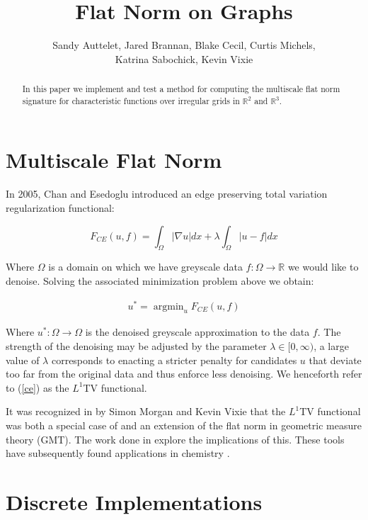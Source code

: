 \documentclass[12pt]{article}
\title{Flat Norm on Graphs}
\author{Sandy Auttelet, Jared Brannan, Blake Cecil, Curtis Michels,\\
 Katrina Sabochick, Kevin Vixie }
\DeclareMathOperator*{\argmin}{argmin}
\begin{document}
\maketitle

\begin{abstract}
In this paper we implement and test a method for computing the multiscale flat norm signature for characteristic functions over irregular grids in $\mathbb{R}^2$ and $\mathbb{R}^3$.
\end{abstract}

\tableofcontents

\section{Multiscale Flat Norm}

In 2005, Chan and Esedoglu introduced an edge preserving total variation regularization functional:

\begin{equation} \label{ce}
F_{CE}(u,f) = \int_\Omega |\nabla u| dx + \lambda \int_{\Omega} |u-f|dx
\end{equation}

Where $\Omega$ is a domain on which we have greyscale data $f:\Omega \to \mathbb{R}$ we would like to denoise. Solving the associated minimization problem above we obtain:

\begin{align*}
u^* = \argmin_u F_{CE}(u,f)
\end{align*}

Where $u^*: \Omega \rightarrow \Omega$ is the denoised greyscale approximation to the data $f$. The strength of the denoising may be adjusted by the parameter $\lambda \in [0,\infty)$, a large value of $\lambda$ corresponds to enacting a stricter penalty for candidates $u$ that deviate too far from the original data and thus enforce less denoising. We henceforth refer to (\ref{ce}) as the $L^1$TV functional.

It was recognized in \cite{Morgan_2007} by Simon Morgan and Kevin Vixie that the $L^1$TV functional was both a special case of and an extension of the flat norm in geometric measure theory (GMT). The work done in \cite{shapes, hu_median, ibrahim_simplicial} explore the implications of this. These tools have subsequently found applications in chemistry \cite{flat_norm_chemistry_fingers}.


\section{Discrete Implementations}
\end{document}
